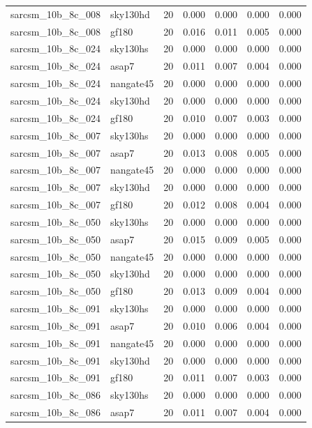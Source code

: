 \begin{tabular}{llrrrrr}
sarcsm\_10b\_8c\_008 & sky130hd & 20 & 0.000 & 0.000 & 0.000 & 0.000 \\
sarcsm\_10b\_8c\_008 & gf180 & 20 & 0.016 & 0.011 & 0.005 & 0.000 \\
sarcsm\_10b\_8c\_024 & sky130hs & 20 & 0.000 & 0.000 & 0.000 & 0.000 \\
sarcsm\_10b\_8c\_024 & asap7 & 20 & 0.011 & 0.007 & 0.004 & 0.000 \\
sarcsm\_10b\_8c\_024 & nangate45 & 20 & 0.000 & 0.000 & 0.000 & 0.000 \\
sarcsm\_10b\_8c\_024 & sky130hd & 20 & 0.000 & 0.000 & 0.000 & 0.000 \\
sarcsm\_10b\_8c\_024 & gf180 & 20 & 0.010 & 0.007 & 0.003 & 0.000 \\
sarcsm\_10b\_8c\_007 & sky130hs & 20 & 0.000 & 0.000 & 0.000 & 0.000 \\
sarcsm\_10b\_8c\_007 & asap7 & 20 & 0.013 & 0.008 & 0.005 & 0.000 \\
sarcsm\_10b\_8c\_007 & nangate45 & 20 & 0.000 & 0.000 & 0.000 & 0.000 \\
sarcsm\_10b\_8c\_007 & sky130hd & 20 & 0.000 & 0.000 & 0.000 & 0.000 \\
sarcsm\_10b\_8c\_007 & gf180 & 20 & 0.012 & 0.008 & 0.004 & 0.000 \\
sarcsm\_10b\_8c\_050 & sky130hs & 20 & 0.000 & 0.000 & 0.000 & 0.000 \\
sarcsm\_10b\_8c\_050 & asap7 & 20 & 0.015 & 0.009 & 0.005 & 0.000 \\
sarcsm\_10b\_8c\_050 & nangate45 & 20 & 0.000 & 0.000 & 0.000 & 0.000 \\
sarcsm\_10b\_8c\_050 & sky130hd & 20 & 0.000 & 0.000 & 0.000 & 0.000 \\
sarcsm\_10b\_8c\_050 & gf180 & 20 & 0.013 & 0.009 & 0.004 & 0.000 \\
sarcsm\_10b\_8c\_091 & sky130hs & 20 & 0.000 & 0.000 & 0.000 & 0.000 \\
sarcsm\_10b\_8c\_091 & asap7 & 20 & 0.010 & 0.006 & 0.004 & 0.000 \\
sarcsm\_10b\_8c\_091 & nangate45 & 20 & 0.000 & 0.000 & 0.000 & 0.000 \\
sarcsm\_10b\_8c\_091 & sky130hd & 20 & 0.000 & 0.000 & 0.000 & 0.000 \\
sarcsm\_10b\_8c\_091 & gf180 & 20 & 0.011 & 0.007 & 0.003 & 0.000 \\
sarcsm\_10b\_8c\_086 & sky130hs & 20 & 0.000 & 0.000 & 0.000 & 0.000 \\
sarcsm\_10b\_8c\_086 & asap7 & 20 & 0.011 & 0.007 & 0.004 & 0.000 \\

\end{tabular}
